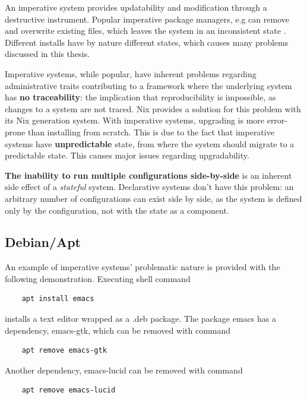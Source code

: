 An imperative system provides updatability and modification through a
destructive instrument. Popular imperative package managers, e.g can
remove and overwrite existing files, which leaves the system in an
inconsistent state \cite{dolstra2008nixos}. Different installs have by
nature different states, which causes many problems discussed in this
thesis.

Imperative systems, while popular, have inherent problems regarding
administrative traits contributing to a framework where the underlying
system has \textbf{no traceability}: the implication that
reproducibility is impossible, as changes to a system are not
traced. Nix provides a solution for this problem with its Nix
generation system. With
imperative systems, upgrading is more error-prone than installing from
scratch. This is due to the fact that imperative systems have
\textbf{unpredictable} state, from where the system should migrate to
a predictable state. This causes major issues regarding
upgradability. \cite{dolstra2007purely}

\textbf{The inability to run multiple configurations side-by-side} is
an inherent side effect of a \textit{stateful} system. Declarative
systems don't have this problem: an arbitrary number of configurations
can exist side by side, as the system is defined only by the
configuration, not with the state as a
component. \cite{dolstra2007purely}

\subsection{Debian/Apt}

An example of imperative systems' problematic nature is provided with
the following demonstration. Executing shell command
\begin{lstlisting}
    apt install emacs
\end{lstlisting}
installs a text editor wrapped as a .deb package.  The package emacs
has a dependency, emacs-gtk, which can be removed with command
\begin{lstlisting}
    apt remove emacs-gtk
\end{lstlisting}
Another dependency, emacs-lucid can be removed with command
\begin{lstlisting}
    apt remove emacs-lucid
\end{lstlisting}

